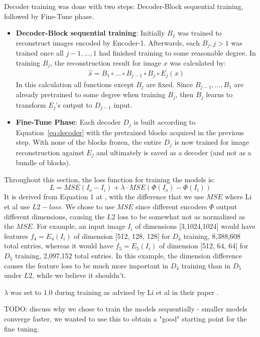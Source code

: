 Decoder training was done with two steps: Decoder-Block sequential training, followed by Fine-Tune phase.
\begin{itemize}
	\item \textbf{Decoder-Block sequential training}: Initially $B_1$ was trained to reconstruct images encoded by Encoder-1. Afterwards, each $B_j, j>1$ was trained once all $j-1,\dots,1$ had finished training to some reasonable degree. In training $B_j$, the reconstruction result for image $x$ was calculated by:
	\begin{gather*}
	\hat{x} = B_1 \circ \dots \circ B_{j-1} \circ B_j \circ E_j (x)
	\end{gather*}
	In this calculation all functions except $B_j$ are fixed. Since $B_{j-1}, \dots, B_1$ are already pretrained to some degree when training $B_j$, then $B_j$ learns to transform $E_j$'s output to $D_{j-1}$ input.
	
	\item \textbf{Fine-Tune Phase}: Each decoder $D_j$ is built according to Equation~\ref*{eq:decoder} with the pretrained blocks acquired in the previous step. With none of the blocks frozen, the entire $D_j$ is now trained for image reconstruction against $E_j$ and ultimately is saved as a decoder (and not as a bundle of blocks).
\end{itemize}

Throughout this section, the loss function for training the models is:
\begin{equation}
L = MSE(I_o-I_i) + \lambda \cdot MSE(\Phi(I_o)-\Phi(I_i))
\end{equation}
It is derived from Equation 1 at \cite{bib11}, with the difference that we use $MSE$ where Li et al use $L2 -loss$. We chose to use $MSE$ since different encoders $\Phi$ output different dimensions, causing the $L2$ loss to be  somewhat not as normalized as the $MSE$. For example, an input image $I_i$ of dimensions [3,1024,1024] would have features $f_4=E_4(I_i)$ of dimension [512, 128, 128] for $D_4$ training, 8,388,608 total entries, whereas it would have $f_5=E_5(I_i)$ of dimension [512, 64, 64] for $D_5$ training, 2,097,152 total entries. In this example, the dimension difference causes the feature loss to be much more important in $D_4$ training than in $D_5$ under $L2$, while we believe it shouldn't.

$\lambda$ was set to $1.0$ during training as advised by Li et al in their paper \cite{bib11}.

TODO: discuss why we chose to train the models sequentially - smaller models converge faster, we wanted to use this to obtain a "good" starting point for the fine tuning.

